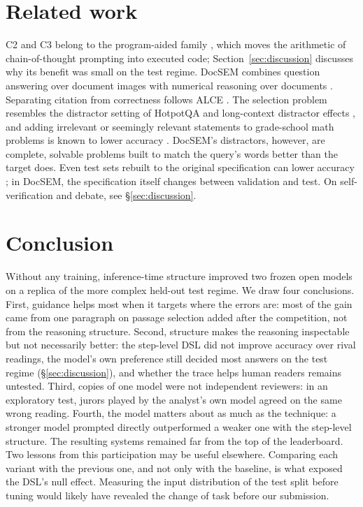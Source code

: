 \documentclass[11pt]{article}%
\begin{document}
\section{Related work}

\textsc{C2} and \textsc{C3} belong to the program-aided family
\citep{gao2023pal,chen2023pot,ye2023satlm}, which moves the arithmetic of
chain-of-thought prompting \citep{wei2022cot} into executed code;
Section~\ref{sec:discussion} discusses why its benefit was small on the test
regime. DocSEM combines question answering over document images
\citep{mathew2021docvqa} with numerical reasoning over documents
\citep{chen2021finqa}. Separating citation from correctness follows ALCE
\citep{gao2023alce}. The selection problem resembles the distractor setting of
HotpotQA \citep{yang2018hotpotqa} and long-context distractor effects
\citep{liu2024lost}, and adding irrelevant or seemingly relevant statements to
grade-school math problems is known to lower accuracy
\citep{shi2023distracted,mirzadeh2025gsmsymbolic}. DocSEM's distractors,
however, are complete, solvable problems built to match the query's words
better than the target does. Even test sets rebuilt to the original
specification can lower accuracy \citep{recht2019imagenet}; in DocSEM, the
specification itself changes between validation and test. On
self-verification and debate, see \S\ref{sec:discussion}.

\section{Conclusion}

Without any training, inference-time structure improved two frozen open models
on a replica of the more complex held-out test regime. We draw four
conclusions. First, guidance helps most when it targets where the errors are:
most of the gain came from one paragraph on passage selection added after the
competition, not from the reasoning structure. Second, structure makes the
reasoning inspectable but not necessarily better: the step-level DSL did not
improve accuracy over rival readings, the model's own preference still decided
most answers on the test regime (\S\ref{sec:discussion}), and whether the
trace helps human readers remains untested. Third, copies of one model were
not independent reviewers: in an exploratory test, jurors played by the
analyst's own model agreed on the same wrong reading. Fourth, the model
matters about as much as the technique: a stronger model prompted directly
outperformed a weaker one with the step-level structure. The resulting systems
remained far from the top of the leaderboard. Two lessons from this participation may
be useful elsewhere. Comparing each variant with the previous one, and not
only with the baseline, is what exposed the DSL's null effect. Measuring the
input distribution of the test split before tuning would likely have revealed
the change of task before our submission.
\end{document}
